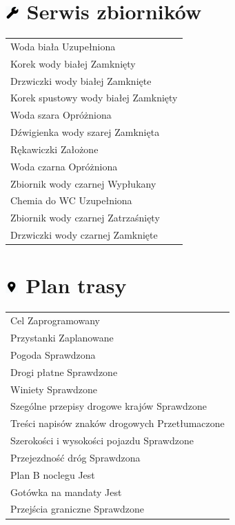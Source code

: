 \documentclass{article}
\begin{document}
\begin{multicols}{2}
\section*{\includegraphics[height=5mm]{service.png} Serwis zbiorników}
\begin{tabularx}{\columnwidth}{|X|}
\hline
Woda biała \dotfill Uzupełniona \\
Korek wody białej \dotfill Zamknięty \\
Drzwiczki wody białej \dotfill Zamknięte \\
Korek spustowy wody białej \dotfill Zamknięty \\
Woda szara \dotfill Opróżniona \\
Dźwigienka wody szarej \dotfill Zamknięta \\
Rękawiczki \dotfill Założone \\
Woda czarna \dotfill Opróżniona \\
Zbiornik wody czarnej \dotfill Wypłukany \\
Chemia do WC \dotfill Uzupełniona \\
Zbiornik wody czarnej \dotfill Zatrzaśnięty \\
Drzwiczki wody czarnej \dotfill Zamknięte \\
\hline
\end{tabularx}

\section*{\includegraphics[height=5mm]{map.png} Plan trasy}
\begin{tabularx}{\columnwidth}{|X|}
\hline
Cel \dotfill Zaprogramowany\\
Przystanki \dotfill Zaplanowane\\
Pogoda \dotfill Sprawdzona\\
Drogi płatne \dotfill Sprawdzone\\
Winiety \dotfill Sprawdzone\\
Szególne przepisy drogowe krajów \dotfill Sprawdzone\\
Treści napisów znaków drogowych \dotfill Przetłumaczone\\
Szerokości i wysokości pojazdu \dotfill Sprawdzone\\
Przejezdność dróg \dotfill Sprawdzona\\
Plan B noclegu \dotfill Jest\\
Gotówka na mandaty \dotfill Jest\\
Przejścia graniczne \dotfill Sprawdzone\\


\end{tabularx}
\end{multicols}
\end{document}
